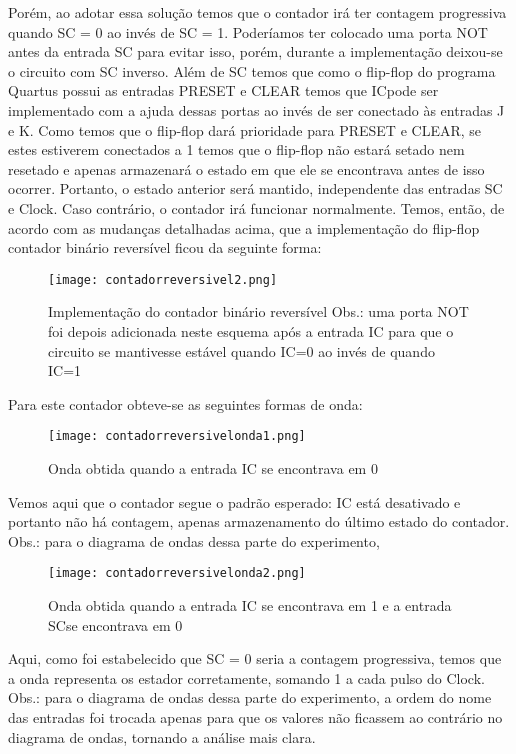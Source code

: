 \documentclass[12pt]{article}
\begin{document}
	
	Porém, ao adotar essa solução temos que o contador irá ter contagem progressiva quando SC = 0 ao invés de SC = 1. Poderíamos ter colocado uma porta NOT antes da entrada SC para evitar isso, porém, durante a implementação deixou-se o circuito com SC inverso.
	Além de SC temos que como o flip-flop do programa Quartus possui as entradas PRESET e CLEAR temos que ICpode ser implementado com a ajuda dessas portas ao invés de ser conectado às entradas J e K. Como temos que o flip-flop dará prioridade para PRESET e CLEAR, se estes estiverem conectados a 1 temos que o flip-flop não estará setado nem resetado e apenas armazenará o estado em que ele se encontrava antes de isso ocorrer. Portanto, o estado anterior será mantido, independente das entradas SC e Clock. Caso contrário, o contador irá funcionar normalmente. 
	Temos, então, de acordo com as mudanças detalhadas acima, que a implementação do flip-flop contador binário reversível ficou da seguinte forma:
	
	\begin{figure}[H]
		\centering
		\texttt{[image: contadorreversivel2.png]}
		\caption{ Implementação do contador binário reversível Obs.: uma porta NOT foi depois adicionada neste esquema após a entrada IC para que o circuito se mantivesse estável quando IC=0 ao invés de quando IC=1 }
		\label{fig:contadorreversivel2}
	\end{figure}
	
	Para este contador obteve-se as seguintes formas de onda: 

	\begin{figure}[H]
		\centering
		\texttt{[image: contadorreversivelonda1.png]}
		\caption{ Onda obtida quando a entrada IC se encontrava em 0 }
		\label{fig:contadorreversivelonda1}
	\end{figure}
	
	Vemos aqui que o contador segue o padrão esperado: IC está desativado e portanto não há contagem, apenas armazenamento do último estado do contador. Obs.: para o diagrama de ondas dessa parte do experimento, 
	

	\begin{figure}[H]
		\centering
		\texttt{[image: contadorreversivelonda2.png]}
		\caption{ Onda obtida quando a entrada IC se encontrava em 1 e a entrada SCse encontrava em 0 }
		\label{fig:contadorreversivelonda2}
	\end{figure}
	
	Aqui, como foi estabelecido que  SC = 0 seria a contagem progressiva, temos que a onda representa os estador corretamente, somando 1 a cada pulso do Clock.  Obs.: para o diagrama de ondas dessa parte do experimento, a ordem do nome das entradas foi trocada apenas para que os valores não ficassem ao contrário no diagrama de ondas, tornando a análise mais clara. 
	
\end{document}
